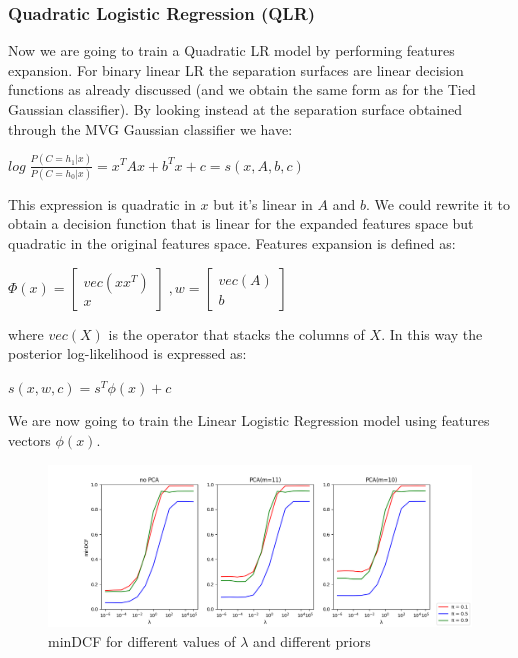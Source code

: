 \documentclass[10pt, a4paper, twocolumn]{article} %
\begin{document}
\subsubsection{Quadratic Logistic Regression (QLR)}
Now we are going to train a Quadratic LR model by performing features expansion.
For binary linear LR the separation surfaces are linear decision functions as already discussed (and
we obtain the same form as for the Tied Gaussian classifier). By looking instead at the separation surface
obtained through the MVG Gaussian classifier we have:
\begin{center}
	\begin{math}
		log\;\frac{P(C=h_1|x)}{P(C=h_0|x)} = x^TAx + b^Tx + c = s(x, A, b, c)
	\end{math}
\end{center}
This expression is quadratic in $x$ but it's linear in $A$ and $b$. 
We could rewrite it to obtain a decision function that is linear for the expanded features space
but quadratic in the original features space. Features expansion is defined as:
\begin{center}
	\begin{math}
		\Phi(x) = \begin{bmatrix}
					vec(xx^T)\\
					x
				  \end{bmatrix} \;, 
		w= 		 \begin{bmatrix}
					vec(A)\\
					b
				  \end{bmatrix}
	\end{math}
\end{center}
where $vec(X)$ is the operator that stacks the columns of $X$. In this way the posterior log-likelihood is expressed as:
\begin{center}
	\begin{math}
		s(x, w, c) = s^T\phi(x)+c
	\end{math}
\end{center}
We are now going to train the Linear Logistic Regression model using features vectors $\phi(x)$.\\
\begin{figure}[ht!]
	\includegraphics[width=\linewidth]{./Pictures/FeaturesAnalysis/dcfplotQLR.png}
	\caption{minDCF for different values of $\lambda$ and different priors}
	\label{dcfQLR} 
\end{figure}
\end{document}
